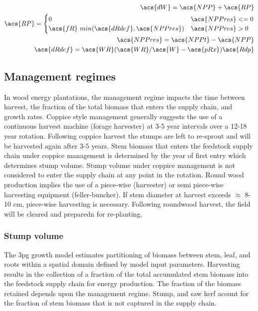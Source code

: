 \documentclass[10pt]{article}
\begin{document}
\begin{align}
\acs{dW}=\acs{NPP}+\acs{RP} \\
\acs{RP} = \begin{cases} 0 & \acs{NPPres} <=0 \\
\acs{fR} ~ min (\acs{dRdef} ,\acs{NPPres}) & \acs{NPPres} > 0  
\end{cases} \\
\acs{NPPres} = \acs{NPPt}-\acs{NPP} \\
\acs{dRdef} = \acs{WR}(\acs{WR}/\acs{W} - \acs{pRx})\acs{Rdp}
\end{align}

\subsection*{Management regimes}
\label{sec:management-reg}
In wood energy plantations, the management regime impacts the time
between harvest, the fraction of the total biomass that enters the
supply chain, and growth rates. Coppice style management generally
suggests the use of a continuous harvest machine (forage harvester) at
3-5 year intervals over a 12-18 year rotation. Following coppice
harvest the stumps are left to re-sprout and will be harvested again
after 3-5 years.  Stem biomass that enters the feedstock supply chain
under coppice management is determined by the year of first entry
which determines stump volume.  Stump volume under coppice management
is not considered to enter the supply chain at any point in the
rotation. Round wood production implies the use of a piece-wise
(harvester) or semi piece-wise harvesting equipment
(feller-buncher). If stem diameter at harvest exceeds $\approx$ 8-10
cm, piece-wise harvesting is necessary. Following roundwood harvest,
the field will be cleared and preparedn for re-planting.


\subsubsection*{Stump volume}
\label{sec:stump-volume}

The \ac{3pg} growth model estimates partitioning of biomass between stem,
leaf, and roots within a spatial domain defined by model input
parameters. Harvesting results in the collection of a fraction of the
total accumulated stem biomass into the feedstock supply chain for
energy production. The fraction of the biomass retained depends upon
the management regime. Stump, and saw kerf acount for the fraction of
stem biomass that is not captured in the supply chain.
\end{document}

